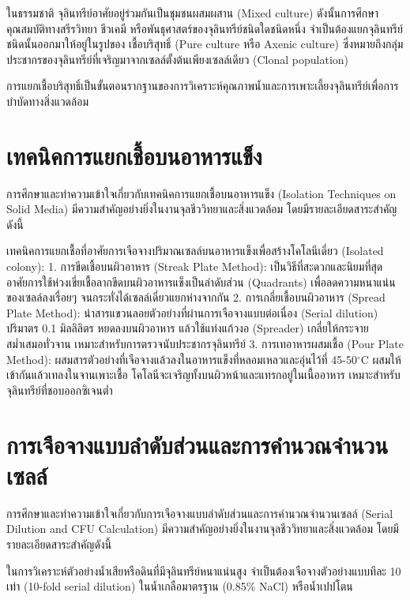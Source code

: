 ในธรรมชาติ จุลินทรีย์อาศัยอยู่ร่วมกันเป็นชุมชนผสมผสาน (Mixed culture) ดังนั้นการศึกษาคุณสมบัติทางสรีรวิทยา ชีวเคมี หรือพันธุศาสตร์ของจุลินทรีย์ชนิดใดชนิดหนึ่ง จำเป็นต้องแยกจุลินทรีย์ชนิดนั้นออกมาให้อยู่ในรูปของ เชื้อบริสุทธิ์ (Pure culture หรือ Axenic culture) ซึ่งหมายถึงกลุ่มประชากรของจุลินทรีย์ที่เจริญมาจากเซลล์ตั้งต้นเพียงเซลล์เดียว (Clonal population)

การแยกเชื้อบริสุทธิ์เป็นขั้นตอนรากฐานของการวิเคราะห์คุณภาพน้ำและการเพาะเลี้ยงจุลินทรีย์เพื่อการบำบัดทางสิ่งแวดล้อม

\section{เทคนิคการแยกเชื้อบนอาหารแข็ง}

การศึกษาและทำความเข้าใจเกี่ยวกับเทคนิคการแยกเชื้อบนอาหารแข็ง (Isolation Techniques on Solid Media) มีความสำคัญอย่างยิ่งในงานจุลชีววิทยาและสิ่งแวดล้อม โดยมีรายละเอียดสาระสำคัญดังนี้

เทคนิคการแยกเชื้อที่อาศัยการเจือจางปริมาณเซลล์บนอาหารแข็งเพื่อสร้างโคโลนีเดี่ยว (Isolated colony):
1. การขีดเชื้อบนผิวอาหาร (Streak Plate Method): เป็นวิธีที่สะดวกและนิยมที่สุด อาศัยการใช้ห่วงเขี่ยเชื้อลากขีดบนผิวอาหารแข็งเป็นลำดับส่วน (Quadrants) เพื่อลดความหนาแน่นของเซลล์ลงเรื่อยๆ จนกระทั่งได้เซลล์เดี่ยวแยกห่างจากกัน
2. การเกลี่ยเชื้อบนผิวอาหาร (Spread Plate Method): นำสารแขวนลอยตัวอย่างที่ผ่านการเจือจางแบบต่อเนื่อง (Serial dilution) ปริมาตร 0.1 มิลลิลิตร หยดลงบนผิวอาหาร แล้วใช้แท่งแก้วงอ (Spreader) เกลี่ยให้กระจายสม่ำเสมอทั่วจาน เหมาะสำหรับการตรวจนับประชากรจุลินทรีย์
3. การเทอาหารผสมเชื้อ (Pour Plate Method): ผสมสารตัวอย่างที่เจือจางแล้วลงในอาหารแข็งที่หลอมเหลวและอุ่นไว้ที่ 45-50$^{\circ}$C ผสมให้เข้ากันแล้วเทลงในจานเพาะเชื้อ โคโลนีจะเจริญทั้งบนผิวหน้าและแทรกอยู่ในเนื้ออาหาร เหมาะสำหรับจุลินทรีย์ที่ชอบออกซิเจนต่ำ

\section{การเจือจางแบบลำดับส่วนและการคำนวณจำนวนเซลล์}

การศึกษาและทำความเข้าใจเกี่ยวกับการเจือจางแบบลำดับส่วนและการคำนวณจำนวนเซลล์ (Serial Dilution and CFU Calculation) มีความสำคัญอย่างยิ่งในงานจุลชีววิทยาและสิ่งแวดล้อม โดยมีรายละเอียดสาระสำคัญดังนี้

ในการวิเคราะห์ตัวอย่างน้ำเสียหรือดินที่มีจุลินทรีย์หนาแน่นสูง จำเป็นต้องเจือจางตัวอย่างแบบทีละ 10 เท่า (10-fold serial dilution) ในน้ำเกลือมาตรฐาน (0.85\% NaCl) หรือน้ำเปปโตน

